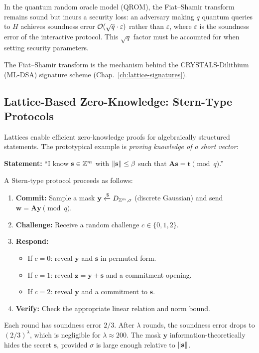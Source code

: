\begin{definition}
\label{def:pq-fiat-shamir}
In the quantum random oracle model (QROM), the Fiat--Shamir transform remains sound but incurs a security loss: an adversary making $q$ quantum queries to $H$ achieves soundness error $\mathcal{O}(\sqrt{q} \cdot \varepsilon)$ rather than $\varepsilon$, where $\varepsilon$ is the soundness error of the interactive protocol.  This $\sqrt{q}$ factor must be accounted for when setting security parameters.
\end{definition}

The Fiat--Shamir transform is the mechanism behind the CRYSTALS-Dilithium (ML-DSA) signature scheme (Chap.~\ref{ch:lattice-signatures}).


\subsection{Lattice-Based Zero-Knowledge: Stern-Type Protocols}
\label{subsec:lattice-zk}

Lattices enable efficient zero-knowledge proofs for algebraically structured statements.  The prototypical example is \emph{proving knowledge of a short vector}:

\begin{example}
\label{ex:stern-proof}
\textbf{Statement:} ``I know $\mathbf{s} \in \mathbb{Z}^m$ with $\left\lVert \mathbf{s} \right\rVert \leq \beta$ such that $\mathbf{A}\mathbf{s} = \mathbf{t} \pmod{q}$.''

A Stern-type protocol proceeds as follows:
\begin{enumerate}
\item \textbf{Commit:} Sample a mask $\mathbf{y} \getsr D_{\Z^m, \sigma}$ (discrete Gaussian) and send $\mathbf{w} = \mathbf{A}\mathbf{y} \pmod{q}$.
\item \textbf{Challenge:} Receive a random challenge $c \in \{0, 1, 2\}$.
\item \textbf{Respond:}
  \begin{itemize}
  \item If $c = 0$: reveal $\mathbf{y}$ and $\mathbf{s}$ in permuted form.
  \item If $c = 1$: reveal $\mathbf{z} = \mathbf{y} + \mathbf{s}$ and a commitment opening.
  \item If $c = 2$: reveal $\mathbf{y}$ and a commitment to $\mathbf{s}$.
  \end{itemize}
\item \textbf{Verify:} Check the appropriate linear relation and norm bound.
\end{enumerate}
Each round has soundness error $2/3$.  After $\lambda$ rounds, the soundness error drops to $(2/3)^\lambda$, which is negligible for $\lambda \approx 200$.  The mask $\mathbf{y}$ information-theoretically hides the secret $\mathbf{s}$, provided $\sigma$ is large enough relative to $\left\lVert \mathbf{s} \right\rVert$.
\end{example}

